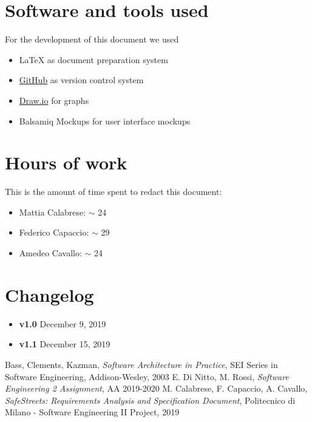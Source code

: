 \setlength{\parindent}{4ex}
\setlength{\parskip}{1ex}

\begin{appendices}

	\section{Software and tools used}
	For the development of this document we used
	\begin{itemize}
		\item \LaTeX{} as document preparation system
		\item \href{http://github.com}{GitHub} as version control system
		\item \href{http://draw.io}{Draw.io} for graphs 
		\item Balsamiq Mockups for user interface mockups
	\end{itemize}
	
	\section{Hours of work}
	This is the amount of time spent to redact this document:
	\begin{itemize}
		\item Mattia Calabrese: $\sim$ 24
		\item Federico Capaccio: $\sim$ 29
		\item Amedeo Cavallo: $\sim$ 24
	\end{itemize}
	
		\section{Changelog}
	\begin{itemize}
		\item \textbf{v1.0} December 9, 2019
		\item \textbf{v1.1} December 15, 2019
	\end{itemize}
	
\end{appendices}


\begin{thebibliography}{9}

Bass, Clements, Kazman, \emph{Software Architecture in Practice}, SEI Series in Software Engineering, Addison-­Wesley, 2003
 E. Di Nitto, M. Rossi, \emph{Software Engineering 2 Assignment}, AA 2019-2020
 M. Calabrese, F. Capaccio, A. Cavallo, \emph{SafeStreets: Requirements Analysis and Specification Document}, Politecnico di Milano - Software Engineering II Project, 2019

\end{thebibliography}